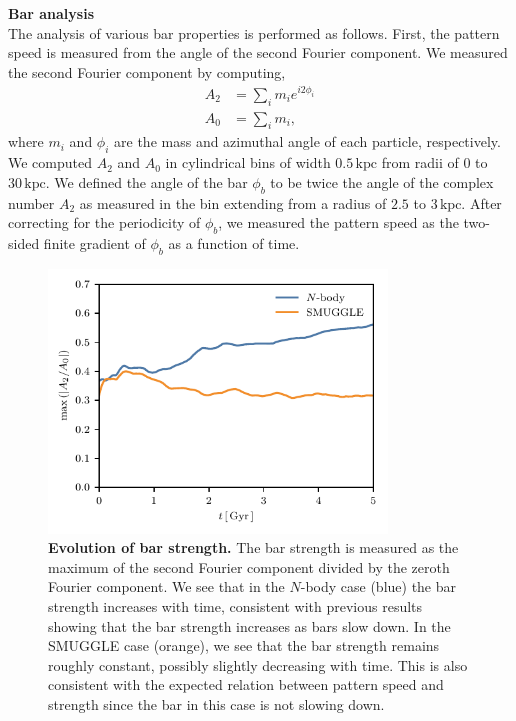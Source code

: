 \documentclass{natureprintstyle}
\newcommand{\Nbody}{$N$-body}
\begin{document}
\noindent
{\bf Bar analysis}
\\
\noindent
The analysis of various bar properties is performed as follows. First, the
pattern speed is measured from the angle of the second Fourier component. We
measured the second Fourier component by computing,
\begin{equation}
\begin{split}
A_2 &= \sum_i m_i e^{i 2 \phi_i} \\
A_0 &= \sum_i m_i \textrm{,}
\end{split}
\end{equation}
where $m_i$ and $\phi_i$ are the mass and azimuthal angle of each particle,
respectively. We computed $A_2$ and $A_0$ in cylindrical bins of width
$0.5\,\textrm{kpc}$ from radii of $0$ to $30\,\textrm{kpc}$. We defined the
angle of the bar $\phi_b$ to be twice the angle of the complex number $A_2$ as
measured in the bin extending from a radius of $2.5$ to $3\,\textrm{kpc}$.
After correcting for the periodicity of $\phi_b$, we measured the pattern
speed as the two-sided finite gradient of $\phi_b$ as a function of time.

\begin{figure}[t!]%
\centering
\includegraphics[width=9cm]{fig/fig-A2.pdf}
\caption{\textbf{Evolution of bar strength.} The bar strength is measured as
the maximum of the second Fourier component divided by the zeroth Fourier
component. We see that in the
\Nbody{} case (blue) the bar strength increases with time, consistent with
previous results showing that the bar strength increases as bars slow down. In
the SMUGGLE case (orange), we see that the bar strength remains roughly
constant, possibly slightly decreasing with time. This is also consistent with
the expected relation between pattern speed and strength since the bar in this
case is not slowing down.}
\label{fig:strength}
\end{figure}
\end{document}
